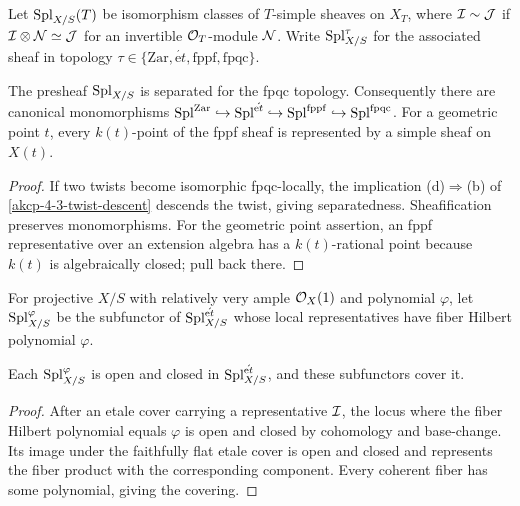\begin{definition}
\label{akcp-5-5-spl}
Let $\operatorname{Spl}_{X/S}(T)$ be isomorphism classes of $T$-simple sheaves on $X_T$,
where $\mathcal I\sim\mathcal J$ if $\mathcal I\otimes\mathcal N\simeq\mathcal J$ for an invertible $\mathcal O_T$-module
$\mathcal N$.  Write $\operatorname{Spl}_{X/S}^{\tau}$ for the associated sheaf in topology
$\tau\in\{\mathrm{Zar},\acute{\mathrm et},\mathrm{fppf},\mathrm{fpqc}\}$.
\end{definition}

\begin{proposition}
\label{akcp-5-6-spl-sheaf}
The presheaf $\operatorname{Spl}_{X/S}$ is separated for the fpqc topology.  Consequently
there are canonical monomorphisms
$\operatorname{Spl}^{\mathrm{Zar}}\hookrightarrow\operatorname{Spl}^{\acute{\mathrm et}}
\hookrightarrow\operatorname{Spl}^{\mathrm{fppf}}\hookrightarrow\operatorname{Spl}^{\mathrm{fpqc}}$.
For a geometric point $t$, every $k(t)$-point of the fppf sheaf is represented
by a simple sheaf on $X(t)$.
\end{proposition}
\begin{proof}
If two twists become isomorphic fpqc-locally, the implication
(d)$\Rightarrow$(b) of \cref{akcp-4-3-twist-descent} descends the twist, giving
separatedness.  Sheafification preserves monomorphisms.  For the geometric
point assertion, an fppf representative over an extension algebra has a
$k(t)$-rational point because $k(t)$ is algebraically closed; pull back there.
\end{proof}

\begin{definition}
\label{akcp-5-7-spl-polynomial}
For projective $X/S$ with relatively very ample $\mathcal O_X(1)$ and polynomial
$\varphi$, let $\operatorname{Spl}^{\varphi}_{X/S}$ be the subfunctor of
$\operatorname{Spl}^{\acute{\mathrm et}}_{X/S}$ whose local representatives have fiber
Hilbert polynomial $\varphi$.
\end{definition}

\begin{lemma}
\label{akcp-5-8-spl-polynomial-open}
Each $\operatorname{Spl}^{\varphi}_{X/S}$ is open and closed in
$\operatorname{Spl}^{\acute{\mathrm et}}_{X/S}$, and these subfunctors cover it.
\end{lemma}
\begin{proof}
After an etale cover carrying a representative $\mathcal I$, the locus where the
fiber Hilbert polynomial equals $\varphi$ is open and closed by cohomology and
base-change.  Its image under the faithfully flat etale cover is open and
closed and represents the fiber product with the corresponding component.
Every coherent fiber has some polynomial, giving the covering.
\end{proof}

